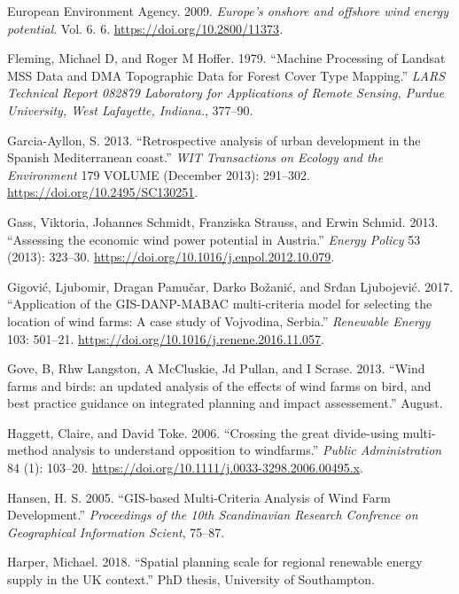 \documentclass[a4paper,]{article}
\theoremstyle{definition}
\theoremstyle{definition}
\theoremstyle{definition}
\theoremstyle{remark}
\begin{document}
\leavevmode\hypertarget{ref-EuropeanEnvironmentAgency2009}{}%
European Environment Agency. 2009. \emph{Europe's onshore and offshore
wind energy potential}. Vol. 6. 6. \url{https://doi.org/10.2800/11373}.

\leavevmode\hypertarget{ref-Fleming1979}{}%
Fleming, Michael D, and Roger M Hoffer. 1979. ``Machine Processing of
Landsat MSS Data and DMA Topographic Data for Forest Cover Type
Mapping.'' \emph{LARS Technical Report 082879 Laboratory for
Applications of Remote Sensing, Purdue University, West Lafayette,
Indiana.}, 377--90.

\leavevmode\hypertarget{ref-Garcia-Ayllon2013}{}%
Garcia-Ayllon, S. 2013. ``Retrospective analysis of urban development in
the Spanish Mediterranean coast.'' \emph{WIT Transactions on Ecology and
the Environment} 179 VOLUME (December 2013): 291--302.
\url{https://doi.org/10.2495/SC130251}.

\leavevmode\hypertarget{ref-Gass2013}{}%
Gass, Viktoria, Johannes Schmidt, Franziska Strauss, and Erwin Schmid.
2013. ``Assessing the economic wind power potential in Austria.''
\emph{Energy Policy} 53 (2013): 323--30.
\url{https://doi.org/10.1016/j.enpol.2012.10.079}.

\leavevmode\hypertarget{ref-Gigovic2017}{}%
Gigović, Ljubomir, Dragan Pamučar, Darko Božanić, and Srđan Ljubojević.
2017. ``Application of the GIS-DANP-MABAC multi-criteria model for
selecting the location of wind farms: A case study of Vojvodina,
Serbia.'' \emph{Renewable Energy} 103: 501--21.
\url{https://doi.org/10.1016/j.renene.2016.11.057}.

\leavevmode\hypertarget{ref-Gove2013}{}%
Gove, B, Rhw Langston, A McCluskie, Jd Pullan, and I Scrase. 2013.
``Wind farms and birds: an updated analysis of the effects of wind farms
on bird, and best practice guidance on integrated planning and impact
assessement.'' August.

\leavevmode\hypertarget{ref-Haggett2006}{}%
Haggett, Claire, and David Toke. 2006. ``Crossing the great divide-using
multi-method analysis to understand opposition to windfarms.''
\emph{Public Administration} 84 (1): 103--20.
\url{https://doi.org/10.1111/j.0033-3298.2006.00495.x}.

\leavevmode\hypertarget{ref-Hansen2005}{}%
Hansen, H. S. 2005. ``GIS-based Multi-Criteria Analysis of Wind Farm
Development.'' \emph{Proceedings of the 10th Scandinavian Research
Confrence on Geographical Information Scient}, 75--87.

\leavevmode\hypertarget{ref-Harper2018}{}%
Harper, Michael. 2018. ``Spatial planning scale for regional renewable
energy supply in the UK context.'' PhD thesis, University of
Southampton.
\end{document}
